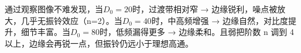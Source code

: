 \documentclass[11pt]{article}
\begin{document}
\vspace{1em}
通过观察图像不难发现，当$D_0=20$时，过渡带相对窄 → 边缘锐利，噪点被放大，几乎无振铃效应（n=2）。当$D_0=40$时，中高频增强 → 边缘自然，对比度提升，细节丰富。当$D_0=80$时，低频漏得更多 → 边缘柔和。且弱把阶数 n 调到 4 以上，边缘会再锐一点，但振铃仍远小于理想高通。
    \begin{center}
    \end{center}
    

    
    
    
\end{document}
